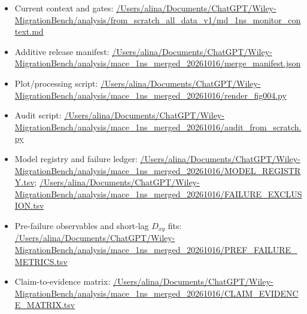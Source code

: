 \begin{itemize}[leftmargin=1.4em,noitemsep]
\item Current context and gates: \begingroup\scriptsize\url{/Users/alina/Documents/ChatGPT/Wiley-MigrationBench/analysis/from_scratch_all_data_v1/md_1ns_monitor_context.md}\endgroup
\item Additive release manifest: \begingroup\scriptsize\url{/Users/alina/Documents/ChatGPT/Wiley-MigrationBench/analysis/mace_1ns_merged_20261016/merge_manifest.json}\endgroup
\item Plot/processing script: \begingroup\scriptsize\url{/Users/alina/Documents/ChatGPT/Wiley-MigrationBench/analysis/mace_1ns_merged_20261016/render_fig004.py}\endgroup
\item Audit script: \begingroup\scriptsize\url{/Users/alina/Documents/ChatGPT/Wiley-MigrationBench/analysis/mace_1ns_merged_20261016/audit_from_scratch.py}\endgroup
\item Model registry and failure ledger: \begingroup\scriptsize\url{/Users/alina/Documents/ChatGPT/Wiley-MigrationBench/analysis/mace_1ns_merged_20261016/MODEL_REGISTRY.tsv}\endgroup; \begingroup\scriptsize\url{/Users/alina/Documents/ChatGPT/Wiley-MigrationBench/analysis/mace_1ns_merged_20261016/FAILURE_EXCLUSION.tsv}\endgroup
\item Pre-failure observables and short-lag $D_{xy}$ fits: \begingroup\scriptsize\url{/Users/alina/Documents/ChatGPT/Wiley-MigrationBench/analysis/mace_1ns_merged_20261016/PREF_FAILURE_METRICS.tsv}\endgroup
\item Claim-to-evidence matrix: \begingroup\scriptsize\url{/Users/alina/Documents/ChatGPT/Wiley-MigrationBench/analysis/mace_1ns_merged_20261016/CLAIM_EVIDENCE_MATRIX.tsv}\endgroup
\end{itemize}
